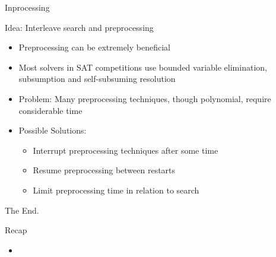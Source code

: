 \documentclass[t]{sdqbeamer}
\begin{document}
\begin{frame}{Inprocessing}

\begin{block}{Idea: Interleave search and preprocessing}
\begin{itemize}
\item Preprocessing can be extremely beneficial
\item Most solvers in SAT competitions use bounded variable elimination, subsumption and self-subsuming resolution
\item Problem: Many preprocessing techniques, though polynomial, require considerable time
\item Possible Solutions:
\begin{itemize}
\item Interrupt preprocessing techniques after some time
\item Resume preprocessing between restarts
\item Limit preprocessing time in relation to search
\end{itemize}
\end{itemize}
\end{block}
\end{frame}




\begin{frame}{The End.}
\begin{block}{Recap}
    \begin{itemize}\setlength{\itemsep}{1em}
        \item 
    \end{itemize}
\end{block}
\end{frame}
\end{document}
